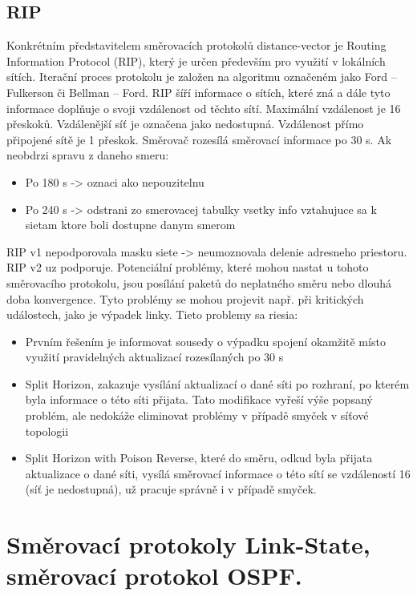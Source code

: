 \subsection{RIP}
Konkrétním představitelem směrovacích protokolů distance-vector je Routing 
Information Protocol (RIP), který je určen především pro využití v lokálních sítích. Iterační proces protokolu je založen na algoritmu označeném jako Ford – Fulkerson či Bellman – Ford. RIP šíří informace o sítích, které zná a dále tyto informace doplňuje o svoji vzdálenost 
od těchto sítí. Maximální vzdálenost je 16 přeskoků. Vzdálenější síť je označena jako 
nedostupná. Vzdálenost přímo připojené sítě je 1 přeskok. Směrovač rozesílá směrovací 
informace po 30 s. Ak neobdrzi spravu z daneho smeru:
\begin{itemize}
\item Po 180 s -> oznaci ako nepouzitelnu
\item Po 240 s -> odstrani zo smerovacej tabulky vsetky info vztahujuce sa k sietam ktore boli dostupne danym smerom
\end{itemize}
RIP v1 nepodporovala masku siete -> neumoznovala delenie adresneho priestoru. RIP v2 uz podporuje. Potenciální problémy, které mohou nastat u tohoto směrovacího protokolu, jsou posílání 
paketů do neplatného směru nebo dlouhá doba konvergence. Tyto problémy se mohou 
projevit např. při kritických událostech, jako je výpadek linky. Tieto problemy sa riesia:
\begin{itemize}
\item Prvním řešením je informovat sousedy o výpadku spojení 
okamžitě místo využití pravidelných aktualizací rozesílaných po 30 s
\item Split Horizon, zakazuje vysílání aktualizací o dané síti po rozhraní, po 
kterém byla informace o této síti přijata. Tato modifikace vyřeší výše popsaný problém, ale 
nedokáže eliminovat problémy v případě smyček v síťové topologii
\item Split Horizon with Poison Reverse, které do směru, odkud byla přijata aktualizace o dané 
síti, vysílá směrovací informace o této sítí se vzdáleností 16 (síť je nedostupná), už pracuje 
správně i v případě smyček.
\end{itemize}
\newpage





\section{Směrovací protokoly Link-State, směrovací protokol OSPF.}
